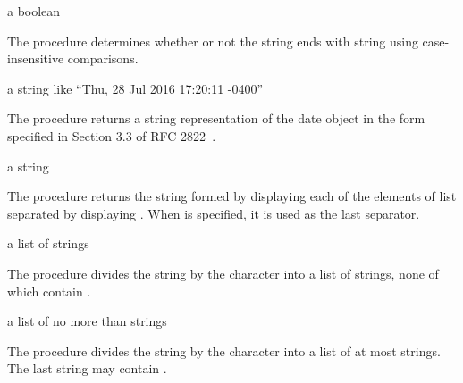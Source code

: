 \begin{procedure}
\end{procedure}
\returns{} a boolean

The  procedure determines whether or not the
string  ends with string  using case-insensitive
comparisons.

\begin{procedure}
\end{procedure}
\returns{} a string like ``Thu, 28 Jul 2016 17:20:11 -0400''

The  procedure returns a string representation of
the date object  in the form specified in Section 3.3 of RFC
2822~\cite{RFC2822}.

\begin{procedure}
\end{procedure}
\returns{} a string

The  procedure returns the string formed by displaying each
of the elements of list  separated by displaying
. When  is specified, it is used as
the last separator.

\begin{procedure}
\end{procedure}
\returns{} a list of strings

The  procedure divides the  string by the
 character into a list of strings, none of which
contain .

\begin{procedure}
\end{procedure}
\returns{} a list of no more than  strings

The  procedure divides the  string by the
 character into a list of at most  strings. The
last string may contain .

